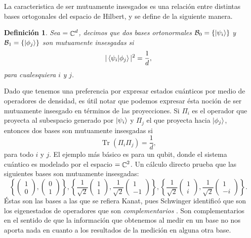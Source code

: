 \documentclass[a4paper,11pt]{report}
\DeclareMathOperator{\C}{\mathbb{C}}
\let\H\relax
\DeclareMathOperator{\H}{\mathcal H}
\DeclareMathOperator{\Tr}{Tr}
\newtheorem{definition}{Definición}
\begin{document}
  La caracteristica de ser mutuamente insesgados es una
  relación entre distintas bases ortogonales del espacio de
  Hilbert, y se define de la siguiente manera.
  \begin{definition}
    Sea $\H = \C^{d}$, decimos que dos bases ortonormales
    $\mathcal B_0 = \{\ket{\psi_i}\}$ y $\mathcal B_1 =
    \{\ket{\phi_j}\}$ son mutuamente insesgadas si
    \begin{equation}
      |\braket{\psi_i|\phi_j}|^2
      = \frac{1}{d},
    \end{equation} 
    para cualesquiera $i$ y $j$.
  \end{definition}
  Dado que tenemos una preferencia por expresar estados
  cuánticos por medio de operadores de densidad, es útil
  notar que podemos expresar ésta noción de ser mutuamente
  insesgado en términos de las proyecciones. Si $\Pi_i$ es el
  operador que proyecta al subespacio generado por
  $\ket{\psi_i}$ y $\Pi_j$ el que proyecta hacia
  $\ket{\phi_j}$, entonces dos bases son mutuamente
  insesgadas si
  \begin{equation}
    \Tr\left( \Pi_i \Pi_j \right) 
    = \frac{1}{d},
  \end{equation}
  para todo $i$ y $j$. El ejemplo más básico es para un
  qubit, donde el sistema cuántico es modelado por el
  espacio $\H = \C^2$.  Un cálculo directo prueba que las
  siguientes bases son mutuamente insesgadas:
  \begin{equation}
    \left\{
      \begin{pmatrix} 1\\0 \end{pmatrix},
      \begin{pmatrix} 0\\1 \end{pmatrix}
    \right\},
    \left\{
      \frac{1}{\sqrt{2}} \begin{pmatrix} 1\\1 \end{pmatrix},
      \frac{1}{\sqrt{2}} \begin{pmatrix} 1\\-1 \end{pmatrix}
    \right\},
    \left\{
      \frac{1}{\sqrt{2}} \begin{pmatrix} 1\\i \end{pmatrix},
      \frac{1}{\sqrt{2}} \begin{pmatrix} 1\\-i \end{pmatrix}
    \right\}.
  \end{equation}
  Éstas son las bases a las que se refiera Kanat, pues
  Schwinger identificó que son los eigenestados de
  operadores que son \textit{complementarios}
  \cite{wootters1989}. Son complementarios en el sentido de
  que la información que obtenemos al medir en un base no
  nos aporta nada en cuanto a los resultados de la medición
  en alguna otra base.
\end{document}
